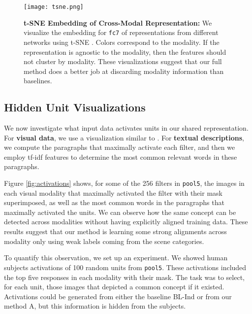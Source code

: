 \documentclass[10pt,journal,compsoc]{IEEEtran}
\begin{document}
     
         
    \begin{figure*}[t!]
        \centering
        \texttt{[image: tsne.png]}
        
        \caption{\textbf{t-SNE Embedding of Cross-Modal Representation:} We visualize the embedding for \texttt{fc7} of representations from different networks using t-SNE \cite{maaten2008visualizing}. Colors correspond to the modality. If the representation is agnostic to the modality, then the features should not cluster by modality. These visualizations suggest that our full method does a better job at discarding modality information than baselines.}
        \label{fig:tsne}
    \end{figure*}

     
	\subsection{Hidden Unit Visualizations}
    
	
	We now investigate what input data activates units in our shared representation. For \textbf{visual data}, we use a visualization similar to \cite{zhou2014object}. For \textbf{textual descriptions}, we compute the paragraphs that maximally activate each filter, and then we employ tf-idf features to determine the most common relevant words in these paragraphs.
	
	Figure \ref{fig:activations} shows, for some of the 256 filters in \texttt{pool5}, the images in each visual modality that maximally activated the filter with their mask superimposed, as well as the most common words in the paragraphs that maximally activated the units.  We can observe how the same concept can be detected across modalities without having explicitly aligned training data. These results suggest that our method is learning some strong alignments across modality only using weak labels coming from the scene categories. 
	
	To quantify this observation, we set up an experiment. We showed human subjects activations of 100 random units from \texttt{pool5}. These activations included the top five responses in each modality with their mask. The task was to select, for each unit, those images that depicted a common concept if it existed. Activations could be generated from either the baseline BL-Ind or from our method A, but this information is hidden from the subjects. 
	
\end{document}
